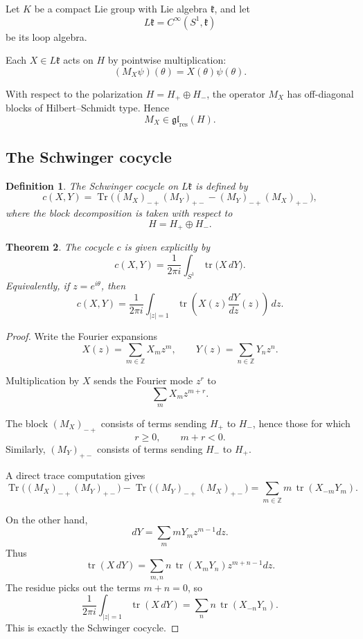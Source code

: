 \documentclass[11pt]{amsart}
\newtheorem{definition}{Definition}[section]
\newtheorem{theorem}[definition]{Theorem}
\begin{document}
Let \(K\) be a compact Lie group with Lie algebra \(\mathfrak k\), and let
\[
L\mathfrak k=C^\infty(S^1,\mathfrak k)
\]
be its loop algebra.

Each \(X\in L\mathfrak k\) acts on \(H\) by pointwise multiplication:
\[
(M_X\psi)(\theta)=X(\theta)\psi(\theta).
\]

With respect to the polarization \(H=H_+\oplus H_-\), the operator \(M_X\) has off-diagonal blocks of Hilbert--Schmidt type. Hence
\[
M_X\in \mathfrak{gl}_{\mathrm{res}}(H).
\]

\subsection{The Schwinger cocycle}

\begin{definition}
The Schwinger cocycle on \(L\mathfrak k\) is defined by
\[
c(X,Y)
=
\operatorname{Tr}\bigl(
(M_X)_{-+}(M_Y)_{+-}
-
(M_Y)_{-+}(M_X)_{+-}
\bigr),
\]
where the block decomposition is taken with respect to
\[
H=H_+\oplus H_-.
\]
\end{definition}

\begin{theorem}
The cocycle \(c\) is given explicitly by
\[
c(X,Y)
=
\frac{1}{2\pi i}
\int_{S^1}
\operatorname{tr}\bigl(X\,dY\bigr).
\]
Equivalently, if \(z=e^{i\theta}\), then
\[
c(X,Y)
=
\frac{1}{2\pi i}
\int_{|z|=1}
\operatorname{tr}\left(X(z)\frac{dY}{dz}(z)\right)\,dz.
\]
\end{theorem}

\begin{proof}
Write the Fourier expansions
\[
X(z)=\sum_{m\in\mathbb Z}X_m z^m,
\qquad
Y(z)=\sum_{n\in\mathbb Z}Y_n z^n.
\]

Multiplication by \(X\) sends the Fourier mode \(z^r\) to
\[
\sum_m X_m z^{m+r}.
\]

The block \((M_X)_{-+}\) consists of terms sending \(H_+\) to \(H_-\), hence those for which
\[
r\geq0,\qquad m+r<0.
\]
Similarly, \((M_Y)_{+-}\) consists of terms sending \(H_-\) to \(H_+\).

A direct trace computation gives
\[
\operatorname{Tr}\bigl((M_X)_{-+}(M_Y)_{+-}\bigr)
-
\operatorname{Tr}\bigl((M_Y)_{-+}(M_X)_{+-}\bigr)
=
\sum_{m\in\mathbb Z} m\, \operatorname{tr}(X_{-m}Y_m).
\]

On the other hand,
\[
dY
=
\sum_m mY_m z^{m-1}dz.
\]
Thus
\[
\operatorname{tr}(X\,dY)
=
\sum_{m,n}
n\,\operatorname{tr}(X_mY_n)z^{m+n-1}dz.
\]
The residue picks out the terms \(m+n=0\), so
\[
\frac{1}{2\pi i}
\int_{|z|=1}
\operatorname{tr}(X\,dY)
=
\sum_n n\,\operatorname{tr}(X_{-n}Y_n).
\]
This is exactly the Schwinger cocycle.
\end{proof}
\end{document}

